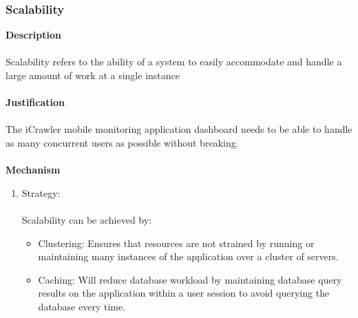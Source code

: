 \documentclass[hidelinks, 12pt, oneside]{article}
\begin{document}
			\subsubsection*{Scalability}
			\textbf{Description} \\\\
			Scalability refers to the ability of a system to easily accommodate and handle a large amount of work at a single instance \\\\
			\textbf{Justification}\\\\
			The iCrawler mobile monitoring application dashboard needs to be able to handle as many concurrent users as possible without breaking.\\\\
			\textbf{Mechanism}
				\begin{enumerate}
					\item Strategy: \\\\
						Scalability can be achieved by:
						\begin{itemize}
							\item Clustering: Ensures that resources are not strained by running or maintaining many instances of the application over a cluster of servers.  
							\item Caching: Will reduce database workload by maintaining database query results on the application within a user session to avoid querying the database every time. 
						\end{itemize}
				\end{enumerate}	
			\newpage
\end{document}
